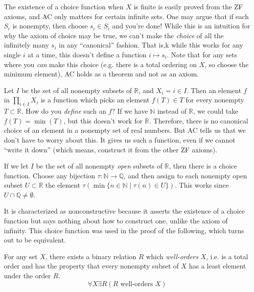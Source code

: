   The existence of a choice function when $X$ is finite is easily proved from the ZF axioms, and AC only matters for certain infinite sets. One may argue that if each $S_i$ is nonempty, then choose $s_i \in S_i$ and you're done! While this is an intuition for why the axiom of choice may be true, we can't make the \textit{choice} of all the infinitely many $s_i$ in any ``canonical'' fashion. That is,k while this works for any single $i$ at a time, this doesn't define a function $i \mapsto s_i$. Note that for any sets where you \textit{can} make this choice (e.g. there is a total ordering on $X$, so choose the minimum element), AC holds as a theorem and not as an axiom. 

  \begin{example}
    Let $I$ be the set of all nonempty subsets of $\mathbb{R}$, and $X_i = i \in I$. Then an element $f$ in $\prod_{i \in I} X_i$ is a function which picks an element $f(T) \in T$ for every nonempty $T \subset \mathbb{R}$. How do you \textit{define} such an $f$? If we have $\mathbb{N}$ instead of $\mathbb{R}$, we could take $f(T) = \min(T)$, but this doesn't work for $\mathbb{R}$. Therefore, there is no canonical choice of an element in a nonempty set of real numbers. But AC tells us that we don't have to worry about this. It gives us such a function, even if we cannot ``write it down'' (which means, construct it from the other ZF axioms).  

    If we let $I$ be the set of all nonempty \textit{open} subsets of $\mathbb{R}$, then there is a choice function. Choose any bijection $\tau: \mathbb{N} \rightarrow \mathbb{Q}$, and then assign to each nonempty open subset $U \subset \mathbb{R}$ the element $\tau (\min\{n \in \mathbb{N} \mid \tau(n) \in U\})$. This works since $U \cap \mathbb{Q} \neq \emptyset$. 
  \end{example}

  It is characterized as nonconstructive because it asserts the existence of a choice function but says nothing about how to construct one, unlike the axiom of infinity. This choice function was used in the proof of the following, which turns out to be equivalent.  

  \begin{axiom}
    For any set $X$, there exists a binary relation $R$ which \textit{well-orders} $X$, i.e. is a total order and has the property that every nonempty subset of $X$ has a least element under the order $R$. 
    \begin{equation}
      \forall X \exists R (R \text{ well-orders } X)
    \end{equation}
  \end{axiom}

